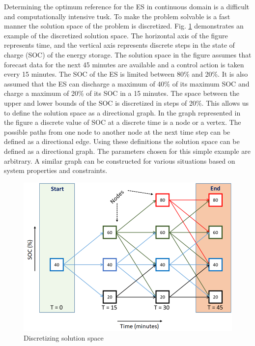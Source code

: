 Determining the optimum reference for the ES in continuous domain is a difficult and computationally intensive tusk. To make the problem solvable is a fast manner the solution space of the problem is discretized. Fig. \ref{fig:F1_Dis} demonstrates an example of the discretized solution space. The horizontal axis of the figure represents time, and the vertical axis represents discrete steps in the state of charge (SOC) of the energy storage. The solution space in the figure assumes that forecast data for the next 45 minutes are available and a control action is taken every 15 minutes. The SOC of the ES is limited between 80\% and 20\%. It is also assumed that the ES can discharge a maximum of 40\% of its maximum SOC and charge a maximum of 20\% of its SOC in a 15 minutes. The space between the upper and lower bounds of the SOC is discretized in steps of 20\%. This allows us to define the solution space as a directional graph. In the graph represented in the figure a discrete value of SOC at a discrete time is a node or a vertex. The possible paths from one node to another node at the next  time step can be defined as a directional edge. Using these definitions the solution space can be defined as a directional graph. The parameters chosen for this simple example are arbitrary. A similar graph can be constructed for various situations based on system properties and constraints.

\begin{figure}[!ht]
    \centering
    \includegraphics[width = 0.6\linewidth]{figs/A8/F1_1_Dis.png}
    \caption{Discretizing solution space}
    \label{fig:F1_Dis}
\end{figure}

